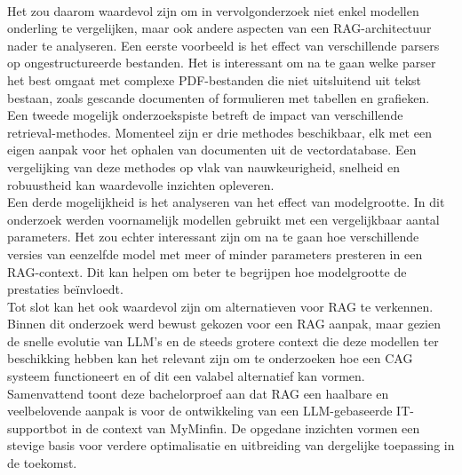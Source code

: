 \\[1em]
Het zou daarom waardevol zijn om in vervolgonderzoek niet enkel modellen onderling te vergelijken, maar ook andere aspecten van een RAG-architectuur nader te analyseren. Een eerste voorbeeld is het effect van verschillende parsers op ongestructureerde bestanden. Het is interessant om na te gaan welke parser het best omgaat met complexe PDF-bestanden die niet uitsluitend uit tekst bestaan, zoals gescande documenten of formulieren met tabellen en grafieken.
\\[1em]
Een tweede mogelijk onderzoekspiste betreft de impact van verschillende retrieval-methodes. Momenteel zijn er drie methodes beschikbaar, elk met een eigen aanpak voor het ophalen van documenten uit de vectordatabase. Een vergelijking van deze methodes op vlak van nauwkeurigheid, snelheid en robuustheid kan waardevolle inzichten opleveren.
\\[1em]
Een derde mogelijkheid is het analyseren van het effect van modelgrootte. In dit onderzoek werden voornamelijk modellen gebruikt met een vergelijkbaar aantal parameters. Het zou echter interessant zijn om na te gaan hoe verschillende versies van eenzelfde model met meer of minder parameters presteren in een RAG-context. Dit kan helpen om beter te begrijpen hoe modelgrootte de prestaties beïnvloedt.
\\[1em]
Tot slot kan het ook waardevol zijn om alternatieven voor RAG te verkennen. Binnen dit onderzoek werd bewust gekozen voor een RAG aanpak, maar gezien de snelle evolutie van LLM's en de steeds grotere context die deze modellen ter beschikking hebben kan het relevant zijn om te onderzoeken hoe een CAG systeem functioneert en of dit een valabel alternatief kan vormen.
\\[1em]
Samenvattend toont deze bachelorproef aan dat RAG een haalbare en veelbelovende aanpak is voor de ontwikkeling van een LLM-gebaseerde IT-supportbot in de context van MyMinfin. De opgedane inzichten vormen een stevige basis voor verdere optimalisatie en uitbreiding van dergelijke toepassing in de toekomst.